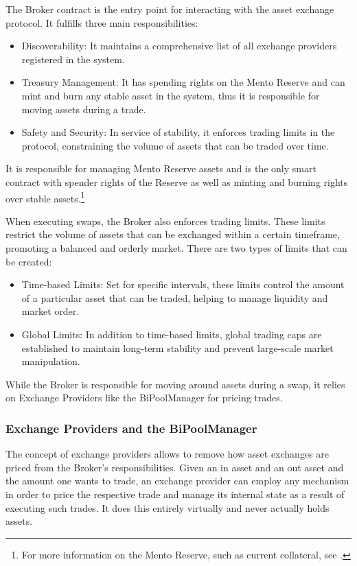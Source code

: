 \documentclass[a4paper]{article}
\theoremstyle{definition}
\begin{document}
The Broker contract is the entry point for interacting with the asset exchange protocol. It fulfills three main responsibilities:

\begin{itemize}
    \item Discoverability: It maintains a comprehensive list of all exchange providers registered in the system.
    \item Treasury Management: It has spending rights on the Mento Reserve and can mint and burn any stable asset in the system, thus it is responsible for moving assets during a trade.
    \item Safety and Security: In service of stability, it enforces trading limits in the protocol, constraining the volume of assets that can be traded over time.
\end{itemize}

It is responsible for managing Mento Reserve assets and is the only smart contract with spender rights of the Reserve as well as minting and burning rights over stable assets.\footnote{For more information on the Mento Reserve, such as current collateral, see \cite{mento_reserve}.} 

When executing swaps, the Broker also enforces trading limits. These limits restrict the volume of assets that can be exchanged within a certain timeframe, promoting a balanced and orderly market. There are two types of limits that can be created:

\begin{itemize}
    \item Time-based Limits: Set for specific intervals, these limits control the amount of a particular asset that can be traded, helping to manage liquidity and market order.
    \item Global Limits: In addition to time-based limits, global trading caps are established to maintain long-term stability and prevent large-scale market manipulation.
\end{itemize}

While the Broker is responsible for moving around assets during a swap, it relies on Exchange Providers like the BiPoolManager for pricing trades.

\subsubsection{Exchange Providers and the BiPoolManager}
The concept of exchange providers allows to remove how asset exchanges are priced from the Broker's responsibilities. Given an in asset and an out asset and the amount one wants to trade, an exchange provider can employ any mechanism in order to price the respective trade and manage its internal state as a result of executing such trades. It does this entirely virtually and never actually holds assets.
\end{document}
